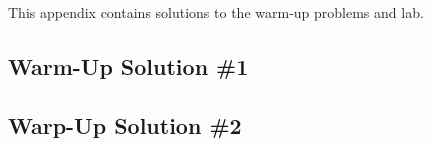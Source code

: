 This appendix contains solutions to the warm-up problems and lab.

\subsection{Warm-Up Solution \#1}
\label{app:warm-up-solution-1}


\subsection{Warp-Up Solution \#2}
\label{app:warm-up-solution-2}
